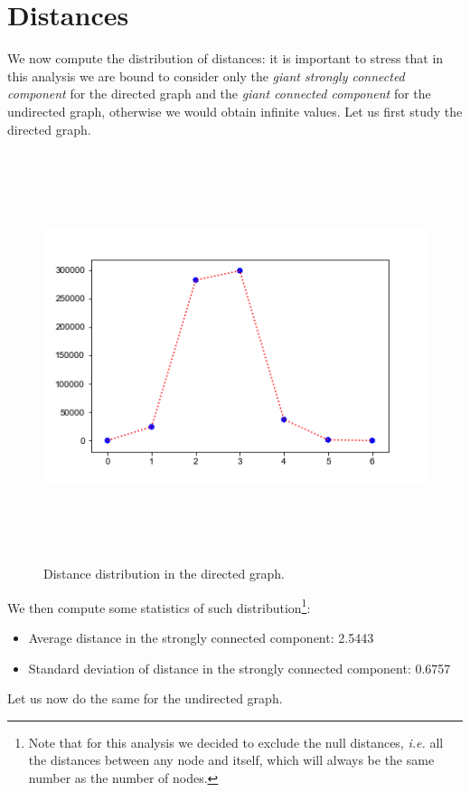 \documentclass{report}
\theoremstyle{definition}
\theoremstyle{remark}
\begin{document}
\section*{Distances}
We now compute the distribution of distances: it is important to stress that in this analysis we are bound to consider only the \textit{giant strongly connected component} for the directed graph and the \textit{giant connected component} for the undirected graph, otherwise we would obtain infinite values. Let us first study the directed graph.
\begin{figure} [H]
	\centering
	\centerline{\includegraphics[width = 13cm, height = 12cm, keepaspectratio]{distance_distribution.png}}
	\label{Dist}
	\caption{Distance distribution in the directed graph.}
\end{figure}
 We then compute some statistics of such distribution\footnote{Note that for this analysis we decided to exclude the null distances, \textit{i.e.} all the distances between any node and itself, which will always be the same number as the number of nodes.}:
 \begin{itemize}
 	\item Average distance in the strongly connected component: 2.5443
 	\item Standard deviation of distance in the strongly connected component: 0.6757
 \end{itemize}
Let us now do the same for the undirected graph.
\end{document}
